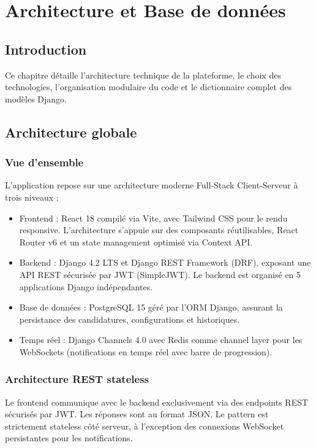 \chapter{Architecture et Base de données}

\section{Introduction}

Ce chapitre détaille l'architecture technique de la plateforme, le choix des technologies, l'organisation modulaire du code et le dictionnaire complet des modèles Django.

\section{Architecture globale}

\subsection{Vue d'ensemble}

L'application repose sur une architecture moderne Full-Stack Client-Serveur à trois niveaux :

\begin{itemize}
\item Frontend : React 18 compilé via Vite, avec Tailwind CSS pour le rendu responsive. L'architecture s'appuie sur des composants réutilisables, React Router v6 et un state management optimisé via Context API.
\item Backend : Django 4.2 LTS et Django REST Framework (DRF), exposant une API REST sécurisée par JWT (SimpleJWT). Le backend est organisé en 5 applications Django indépendantes.
\item Base de données : PostgreSQL 15 géré par l'ORM Django, assurant la persistance des candidatures, configurations et historiques.
\item Temps réel : Django Channels 4.0 avec Redis comme channel layer pour les WebSockets (notifications en temps réel avec barre de progression).
\end{itemize}

\subsection{Architecture REST stateless}

Le frontend communique avec le backend exclusivement via des endpoints REST sécurisés par JWT. Les réponses sont au format JSON. Le pattern est strictement stateless côté serveur, à l'exception des connexions WebSocket persistantes pour les notifications.

